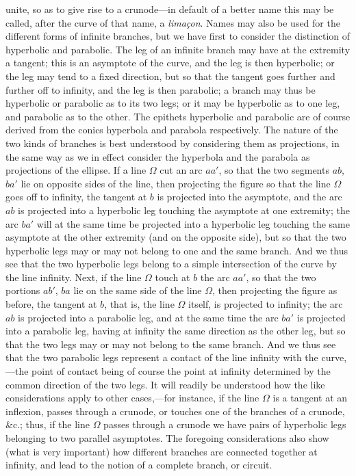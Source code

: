 \documentclass[12pt,a4paper,oneside]{book}
\begin{document}
\newpage
unite, so as to give rise to a crunode---in default of a better name this may be called, after the curve of that name, a \textit{lima\c{c}on}. Names may also be used for the different forms of infinite branches, but we have first to consider the distinction of hyperbolic and parabolic. The leg of an infinite branch may have at the extremity a tangent; this is an asymptote of the curve, and the leg is then hyperbolic; or the leg may tend to a fixed direction, but so that the tangent goes further and further off to infinity, and the leg is then parabolic; a branch may thus be hyperbolic or parabolic as to its two legs; or it may be hyperbolic as to one leg, and parabolic as to the other. The epithets hyperbolic and parabolic are of course derived from the conics hyperbola and parabola respectively. The nature of the two kinds of branches is best understood by considering them as projections, in the same way as we in effect consider the hyperbola and the parabola as projections of the ellipse. If a line $\Omega$ cut an arc $aa'$, so that the two segments $ab$, $ba'$ lie on opposite sides of the line, then projecting the figure so that the line $\Omega$ goes off to infinity, the tangent at $b$ is projected into the asymptote, and the arc $ab$ is projected into a hyperbolic leg touching the asymptote at one extremity; the arc $ba'$ will at the same time be projected into a hyperbolic leg touching the same asymptote at the other extremity (and on the opposite side), but so that the two hyperbolic legs may or may not belong to one and the same branch. And we thus see that the two hyperbolic legs belong to a simple intersection of the curve by the line infinity. Next, if the line $\Omega$ touch at $b$ the arc $aa'$, so that the two portions $ab'$, $ba$ lie on the same side of the line $\Omega$, then projecting the figure as before, the tangent at $b$, that is, the line $\Omega$ itself, is projected to infinity; the arc $ab$ is projected into a parabolic leg, and at the same time the arc $ba'$ is projected into a parabolic leg, having at infinity the same direction as the other leg, but so that the two legs may or may not belong to the same branch. And we thus see that the two parabolic legs represent a contact of the line infinity with the curve,---the point of contact being of course the point at infinity determined by the common direction of the two legs. It will readily be understood how the like considerations apply to other cases,---for instance, if the line $\Omega$ is a tangent at an inflexion, passes through a crunode, or touches one of the branches of a crunode, \&c.; thus, if the line $\Omega$ passes through a crunode we have pairs of hyperbolic legs belonging to two parallel asymptotes. The foregoing considerations also show (what is very important) how different branches are connected together at infinity, and lead to the notion of a complete branch, or circuit.
\end{document}
